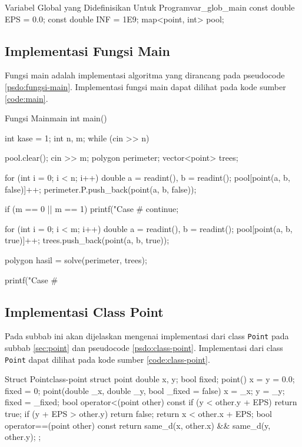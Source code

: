\begin{code}[firstnumber=1]{Variabel Global yang Didefinisikan Untuk Program}{var_glob_main}
const double EPS = 0.0;
const double INF = 1E9;
map<point, int> pool;
\end{code}

\subsection{ Implementasi Fungsi Main}
Fungsi main adalah implementasi algoritma yang dirancang pada pseudocode \ref{psdo:fungsi-main}. Implementasi fungsi main dapat dilihat pada kode sumber \ref{code:main}. 
\newpage
\begin{code}[firstnumber=1]{Fungsi Main}{main}
int main(){
	int kase = 1;
	int n, m;
	while (cin >> n){
		pool.clear();
		cin >> m;
		polygon perimeter;
		vector<point> trees;

		for (int i = 0; i < n; i++){
			double a = readint(), b = readint();
			pool[point(a, b, false)]++;
			perimeter.P.push_back(point(a, b, false));
		}

		if (m == 0 || m == 1){
			printf("Case #%
			continue;
		}

		for (int i = 0; i < m; i++){
			double a = readint(), b = readint();
			pool[point(a, b, true)]++;
			trees.push_back(point(a, b, true));
		}

		polygon hasil = solve(perimeter, trees);

		printf("Case #%
	}
}
\end{code}

\subsection{ Implementasi Class Point}
Pada subbab ini akan dijelaskan mengenai implementasi dari class \texttt{Point} pada subbab \ref{sec:point} dan pseudocode \ref{psdo:class-point}. Implementasi dari class \texttt{Point} dapat dilihat pada kode sumber \ref{code:class-point}.

\begin{code}[firstnumber=1]{Struct Point}{class-point}
struct point{
	double x, y;
	bool fixed;
	point(){
		x = y = 0.0;
		fixed = 0;
	}
	point(double _x, double _y, bool _fixed = false){
		x = _x;
		y = _y;
		fixed = _fixed;
	}
	bool operator<(point other) const{
		if (y < other.y + EPS)
			return true;
		if (y + EPS > other.y)
			return false;
		return x < other.x + EPS;
	}
	bool operator==(point other) const{
		return same_d(x, other.x) && same_d(y, other.y);
	}
};
\end{code}


